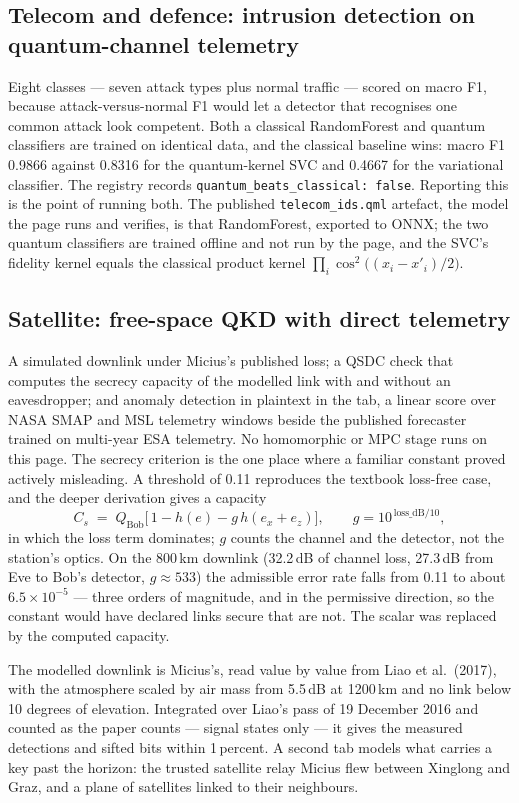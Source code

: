 \documentclass[11pt,a4paper]{article}
\begin{document}
\subsection{Telecom and defence: intrusion detection on quantum-channel telemetry}
Eight classes --- seven attack types plus normal traffic --- scored on macro F1, because
attack-versus-normal F1 would let a detector that recognises one common attack look competent. Both
a classical RandomForest and quantum classifiers are trained on identical data, and the classical
baseline wins: macro F1 0.9866 against 0.8316 for the quantum-kernel SVC and 0.4667 for the
variational classifier. The registry records \texttt{quantum\_beats\_classical: false}. Reporting
this is the point of running both. The published \texttt{telecom\_ids.qml} artefact, the model the
page runs and verifies, is that RandomForest, exported to ONNX; the two quantum classifiers are
trained offline and not run by the page, and the SVC's fidelity kernel equals the classical product
kernel $\prod_i \cos^2\bigl((x_i - x'_i)/2\bigr)$.

\subsection{Satellite: free-space QKD with direct telemetry}
A simulated downlink under Micius's published loss; a QSDC check that computes the secrecy capacity
of the modelled link with and without an eavesdropper; and anomaly detection in plaintext in the
tab, a linear score over NASA SMAP and MSL telemetry windows beside the published forecaster trained
on multi-year ESA telemetry. No homomorphic or MPC stage runs on this page. The secrecy criterion is
the one place where a familiar constant proved actively misleading. A threshold of 0.11 reproduces
the textbook loss-free case, and the deeper derivation gives a capacity
\[
  C_s \;=\; Q_{\text{Bob}}\bigl[\,1 - h(e) - g\,h(e_x + e_z)\bigr],
  \qquad g = 10^{\,\text{loss\_dB}/10},
\]
in which the loss term dominates; $g$ counts the channel and the detector, not the station's optics.
On the 800\,km downlink (32.2\,dB of channel loss, 27.3\,dB from Eve to Bob's detector, $g \approx 533$)
the admissible error rate falls from 0.11 to about $6.5\times10^{-5}$ --- three orders of magnitude, and
in the permissive direction, so the constant would have declared links secure that are not. The scalar
was replaced by the computed capacity.

The modelled downlink is Micius's, read value by value from Liao et al.\ (2017), with the atmosphere
scaled by air mass from 5.5\,dB at 1200\,km and no link below 10 degrees of elevation. Integrated over
Liao's pass of 19 December 2016 and counted as the paper counts --- signal states only --- it gives the
measured detections and sifted bits within 1\,percent. A second tab models what carries a key past the
horizon: the trusted satellite relay Micius flew between Xinglong and Graz, and a plane of satellites
linked to their neighbours.
\end{document}
